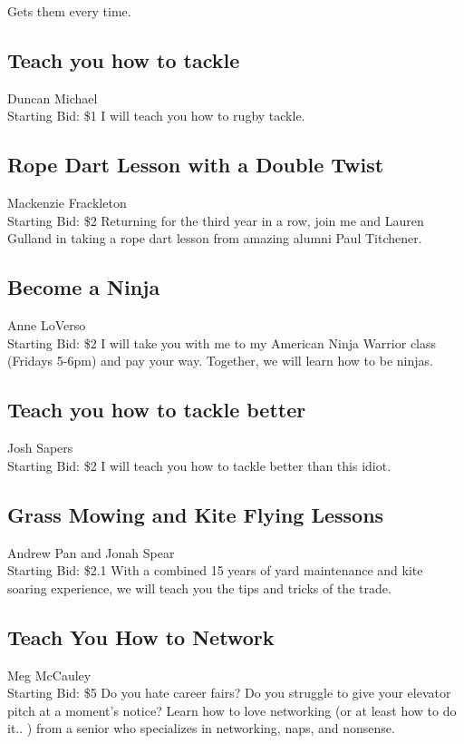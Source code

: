 \documentclass[11pt]{article}
\begin{document}
Gets them every time.
\subsection{Teach you how to tackle}
Duncan Michael
\\
Starting Bid: \$1
\newline
I will teach you how to rugby tackle.
\subsection{Rope Dart Lesson with a Double Twist}
Mackenzie Frackleton 
\\
Starting Bid: \$2
\newline
Returning for the third year in a row, join me and Lauren Gulland in taking a rope dart lesson from amazing alumni Paul Titchener.
\subsection{Become a Ninja}
Anne LoVerso
\\
Starting Bid: \$2
\newline
I will take you with me to my American Ninja Warrior class (Fridays 5-6pm) and pay your way.  Together, we will learn how to be ninjas.
\subsection{Teach you how to tackle better}
Josh Sapers
\\
Starting Bid: \$2
\newline
I will teach you how to tackle better than this idiot.
\subsection{Grass Mowing and Kite Flying Lessons}
Andrew Pan and Jonah Spear
\\
Starting Bid: \$2.1
\newline
With a combined 15 years of yard maintenance and kite soaring experience, we will teach you the tips and tricks of the trade.
\subsection{Teach You How to Network }
Meg McCauley 
\\
Starting Bid: \$5
\newline
Do you hate career fairs? Do you struggle to give your elevator pitch at a moment's notice? Learn how to love networking (or at least how to do it.. ) from a senior who specializes in networking, naps, and nonsense.
\end{document}
